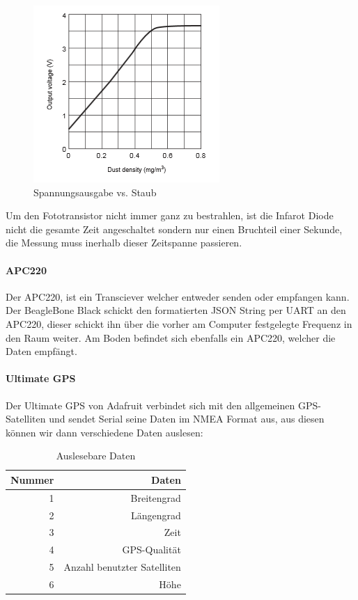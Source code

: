 \begin{figure}[h]
	\centering
	\includegraphics[scale=0.5]{2_Beschreibung_des_CANSAT/graph_photodiode_sharp.png}
	\caption{Spannungsausgabe vs. Staub}
	\label{graph photodiode}
\end{figure}

Um den Fototransistor nicht immer ganz zu bestrahlen, ist die Infarot Diode nicht die gesamte Zeit angeschaltet sondern nur einen Bruchteil einer Sekunde, die Messung muss inerhalb dieser Zeitspanne passieren.

\paragraph{APC220}
Der APC220, ist ein Transciever welcher entweder senden oder empfangen kann. Der BeagleBone Black schickt den formatierten JSON String per UART an den APC220, dieser schickt ihn über die vorher am Computer festgelegte Frequenz in den Raum weiter. Am Boden befindet sich ebenfalls ein APC220, welcher die Daten empfängt.

\paragraph{Ultimate GPS}
Der Ultimate GPS von Adafruit verbindet sich mit den allgemeinen GPS-Satelliten und sendet Serial seine Daten im NMEA Format aus, aus diesen können wir dann verschiedene Daten auslesen:

\begin{table}[H]
  \centering
    \begin{tabular}{rr}
    \toprule
    \textbf{Nummer} & \textbf{Daten} \\
    \midrule 
    1 & Breitengrad \\
    2 & Längengrad \\
    3 & Zeit \\
    4 & GPS-Qualität \\
    5 & Anzahl benutzter Satelliten \\
    6 & Höhe \\
    \bottomrule
    \end{tabular}
    \caption{Auslesebare Daten}
\end{table}

